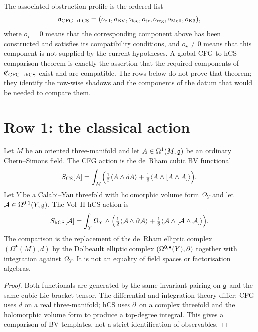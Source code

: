 \begin{definition}
The associated obstruction profile is the ordered list
\[
\mathfrak o_{\mathrm{CFG}\to\mathrm{hCS}}
=
(o_{\mathrm{ell}},o_{\mathrm{BV}},o_{\mathrm{fac}},
o_{\mathrm{tr}},o_{\mathrm{reg}},o_{\mathrm{Mell}},o_{\mathrm{K3}}),
\]
where \(o_\star=0\) means that the corresponding component above has
been constructed and satisfies its compatibility conditions, and
\(o_\star\neq0\) means that this component is not supplied by the
current hypotheses. A global CFG-to-hCS comparison theorem is exactly
the assertion that the required components of
\(\mathfrak C_{\mathrm{CFG}\to\mathrm{hCS}}\) exist and are compatible. The
rows below do not prove that theorem; they identify the row-wise shadows
and the components of the datum that would be needed to compare them.
\end{definition}

\section{Row 1: the classical action}
\label{sec:cfg-row-1-classical-action}

\begin{theorem}
\label{thm:cfg-row-1}
Let $M$ be an oriented three-manifold and let
$A\in\Omega^1(M,\mathfrak{g})$ be an ordinary Chern--Simons field. The CFG action
is the de~Rham cubic BV functional
\[
 S_{\mathrm{CS}}[A] =
 \int_M \Bigl(\tfrac12\langle A\wedge dA\rangle
 + \tfrac16\langle A\wedge[A\wedge A]\rangle\Bigr).
\]
Let $Y$ be a Calabi--Yau threefold with holomorphic volume form
$\Omega_Y$ and let $\mathcal{A}\in\Omega^{0,1}(Y,\mathfrak{g})$. The Vol~II hCS action is
\[
 S_{\mathrm{hCS}}[\mathcal{A}] = \int_Y \Omega_Y \wedge
 \Bigl( \tfrac12\langle \mathcal{A}\wedge \bar\partial\mathcal{A}\rangle
 + \tfrac16\langle\mathcal{A}\wedge[\mathcal{A}\wedge\mathcal{A}]\rangle\Bigr).
\]
The comparison is the replacement of the de~Rham elliptic complex
$(\Omega^\bullet(M),d)$ by the Dolbeault elliptic complex
$(\Omega^{0,\bullet}(Y),\bar\partial)$ together with integration against
$\Omega_Y$. It is not an equality of field spaces or factorisation
algebras.
\end{theorem}

\begin{proof}
Both functionals are generated by the same invariant pairing on $\mathfrak{g}$
and the same cubic Lie bracket tensor. The differential and integration
theory differ: CFG uses $d$ on a real three-manifold; hCS uses $\bar\partial$
on a complex threefold and the holomorphic volume form to produce a
top-degree integral. This gives a comparison of BV templates, not a
strict identification of observables.
\end{proof}

